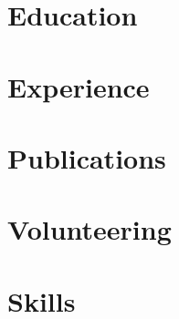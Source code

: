 \documentclass[11pt,letterpaper]{article}
\begin{document}
\pagestyle{empty}



\section{Education}


\section{Experience}


\section{Publications}


\section{Volunteering}


\section{Skills}

\end{document}
